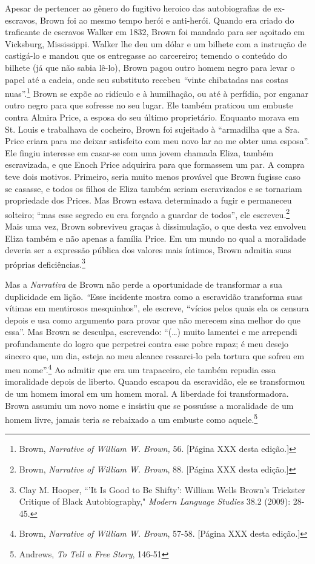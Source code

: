 Apesar de pertencer ao gênero do fugitivo heroico das autobiografias de
ex-escravos, Brown foi ao mesmo tempo herói e anti-herói. Quando era
criado do traficante de escravos Walker em 1832, Brown foi mandado para
ser açoitado em Vicksburg, Mississippi. Walker lhe deu um dólar e um
bilhete com a instrução de castigá-lo e mandou que os entregasse ao
carcereiro; temendo o conteúdo do bilhete (já que não sabia lê-lo),
Brown pagou outro homem negro para levar o papel até a cadeia, onde seu
substituto recebeu \emph{``}vinte chibatadas nas costas
nuas''.\footnote{Brown, \emph{Narrative of William W. Brown,} 56.
  {[}Página XXX desta edição.{]}} Brown se expõe ao ridículo e à
humilhação, ou até à perfídia, por enganar outro negro para que sofresse
no seu lugar. Ele também praticou um embuste contra Almira Price, a
esposa do seu último proprietário. Enquanto morava em St. Louis e
trabalhava de cocheiro, Brown foi sujeitado à ``armadilha que a Sra.
Price criara para me deixar satisfeito com meu novo lar ao me obter uma
esposa''. Ele fingiu interesse em casar-se com uma jovem chamada Eliza,
também escravizada, e que Enoch Price adquirira para que formassem um
par. A compra teve dois motivos. Primeiro, seria muito menos provável
que Brown fugisse caso se casasse, e todos os filhos de Eliza também
seriam escravizados e se tornariam propriedade dos Prices. Mas Brown
estava determinado a fugir e permaneceu solteiro; ``mas esse segredo eu
era forçado a guardar de todos'', ele escreveu.\footnote{Brown,
  \emph{Narrative of William W. Brown}, 88. {[}Página XXX desta
  edição.{]}} Mais uma vez, Brown sobreviveu graças à dissimulação, o
que desta vez envolveu Eliza também e não apenas a família Price. Em um
mundo no qual a moralidade deveria ser a expressão pública dos valores
mais íntimos, Brown admitia suas próprias deficiências.\footnote{Clay M.
  Hooper, ``'It Is Good to Be Shifty': William Wells Brown's Trickster
  Critique of Black Autobiography," \emph{Modern Language Studies} 38.2
  (2009): 28-45.}

Mas a \emph{Narrativa} de Brown não perde a oportunidade de transformar
a sua duplicidade em lição. \emph{``}Esse incidente mostra como a
escravidão transforma suas vítimas em mentirosos mesquinhos'', ele
escreve, ``vícios pelos quais ela os censura depois e usa como argumento
para provar que não merecem sina melhor do que essa''. Mas Brown se
desculpa, escrevendo: ``(\ldots{}) muito lamentei e me arrependi
profundamente do logro que perpetrei contra esse pobre rapaz; é meu
desejo sincero que, um dia, esteja ao meu alcance ressarci-lo pela
tortura que sofreu em meu nome''.\footnote{Brown, \emph{Narrative of
  William W. Brown}, 57-58. {[}Página XXX desta edição.{]}} Ao admitir
que era um trapaceiro, ele também repudia essa imoralidade depois de
liberto. Quando escapou da escravidão, ele se transformou de um homem
imoral em um homem moral. A liberdade foi transformadora. Brown assumiu
um novo nome e insistiu que se possuísse a moralidade de um homem livre,
jamais teria se rebaixado a um embuste como aquele.\footnote{Andrews,
  \emph{To Tell a Free Story}, 146-51}

